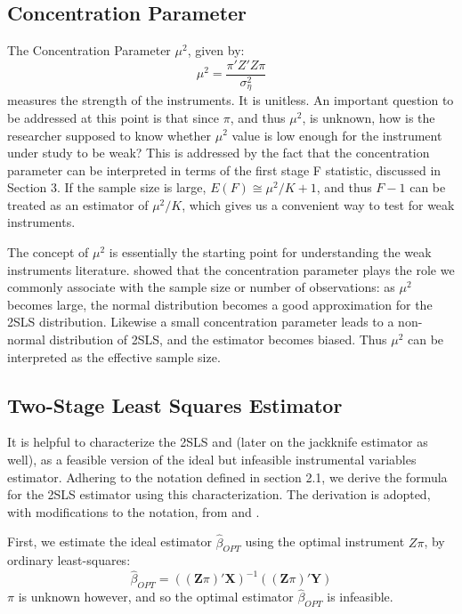 \subsection{Concentration Parameter}
The Concentration Parameter $\mu^2$, given by:
        \begin{equation}
  \mu^2 = \frac{\pi' Z' Z \pi}{\sigma_{\eta}^2}
        \end{equation}
measures the strength of the instruments. It is unitless. An important question to be addressed at this point is that since $\pi$, and thus $\mu^2$, is unknown, how is the researcher supposed to know whether $\mu^2$ value is low enough for the instrument under study to be weak? This is addressed by the fact that the concentration parameter can be interpreted in terms of the first stage F statistic, discussed in Section 3. If the sample size is large, $E(F) \cong \mu^2/K + 1$, and thus $F-1$ can be treated as an estimator of $\mu^2 /K$, which gives us a convenient way to test for weak instruments. 


\par The concept of $\mu^2$ is essentially the starting point for understanding the weak instruments literature. \cite{rothenberg1984approximating} showed that the concentration parameter plays the role we commonly associate with the sample size or number of observations: as $\mu^2$ becomes large, the normal distribution becomes a good approximation for the 2SLS distribution. Likewise a small concentration parameter leads to a non-normal distribution of 2SLS, and the estimator becomes biased. Thus $\mu^2$ can be interpreted as the effective sample size.


\subsection{Two-Stage Least Squares Estimator}

It is helpful to characterize the 2SLS and (later on the jackknife estimator as well), as a feasible version of the ideal but infeasible instrumental variables estimator. Adhering to the notation defined in section 2.1, we derive the formula for the 2SLS estimator using this characterization. The derivation is adopted, with modifications to the notation, from \cite{brucehansen2019} and \cite{angrist1999jackknife}. 
\par First, we estimate the ideal estimator $\hat\beta_{OPT}$ using the optimal instrument $Z\pi$, by ordinary least-squares:
\begin{equation}
\hat\beta_{OPT}= ((\mathbf{Z}\pi)'\mathbf{X})^{-1}((\mathbf{Z}\pi)'\mathbf{Y})
\end{equation}
$\pi$ is unknown however, and so the optimal estimator $\hat\beta_{OPT}$ is infeasible.

